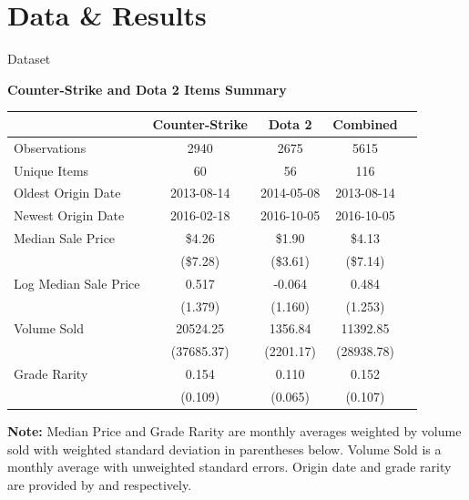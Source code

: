 \documentclass[xcolor=table, envcountsect,12pt]{beamer}
\theoremstyle{remark}
\theoremstyle{theorem}
\theoremstyle{plain}
\begin{document}
\section{Data \& Results}
\begin{frame}[shrink=30]{Dataset}
	\begin{table}[h]
	\textbf{Counter-Strike and Dota 2 Items Summary}
	\begin{center}
	\begin{tabular}{lcccc}
	\hline
	                        & Counter-Strike    & Dota 2    & Combined &  \\
	\toprule
	Observations            & 2940          & 2675          & 5615  &  \\
	Unique Items            & 60            & 56            & 116   &  \\
	Oldest Origin Date      & 2013-08-14    & 2014-05-08    & 2013-08-14 &  \\
	Newest Origin Date      & 2016-02-18    & 2016-10-05    & 2016-10-05 &  \\
	Median Sale Price       & \$4.26        & \$1.90        & \$4.13    & \\ 
	                        & (\$7.28)      & (\$3.61)      & (\$7.14) &  \\
	Log Median Sale Price   & 0.517         & -0.064        & 0.484 & \\
	                        & (1.379)       & (1.160)       & (1.253)   & \\
	Volume Sold             & 20524.25      &  1356.84      & 11392.85  & \\ 
	                        & (37685.37)    & (2201.17)     & (28938.78) & \\
	Grade Rarity            & 0.154         & 0.110         & 0.152 & \\ 
	                        & (0.109)       & (0.065)       & (0.107)   & \\
	\bottomrule
	\end{tabular}

	\vspace{2mm}
	\raggedright\footnotesize{\textbf{Note:} Median Price and Grade Rarity are monthly averages weighted by volume sold with weighted standard deviation in parentheses below. Volume Sold is a monthly average with unweighted standard errors. Origin date and grade rarity are provided by \citeauthor{cs2db} and \citeauthor{backpackcs} \nocite{backpackdota} respectively.}
	\end{center}
	\end{table}
\end{frame}
\end{document}
